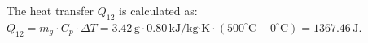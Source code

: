 The heat transfer \( Q_{12} \) is calculated as:  
\( Q_{12} = m_g \cdot C_p \cdot \Delta T = 3.42 \, \text{g} \cdot 0.80 \, \text{kJ/kg·K} \cdot (500^\circ \text{C} - 0^\circ \text{C}) = 1367.46 \, \text{J} \).